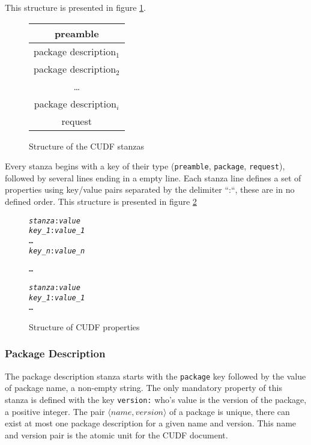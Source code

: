 This structure is presented in figure \ref{formal:cudfstruct}.

\begin{figure}[htp]
\centering
\begin{tabular}{|c|}
\hline preamble \\ \hline
\hline package description$_{1}$ \\ \hline
\hline package description$_{2}$ \\ \hline
 \multicolumn{1}{c}{\ldots}  \\ 
\hline package description$_{i}$\\ \hline
\hline request\\ \hline
\end{tabular}
\caption{Structure of the CUDF stanzas}
\label{formal:cudfstruct}
\end{figure}

Every stanza begins with a key of their type (\verb+preamble+, \verb+package+, \verb+request+), followed by several lines ending in a empty line.
Each stanza line defines a set of properties using key/value pairs separated by the delimiter ``:``, these are in no defined order.
This structure is presented in figure \ref{formal.cudfproperties}

\begin{figure}[htp] 
\begin{center}
\begin{alltt}
\textit{stanza}: \textit{value}
\textit{key_1\)}: \textit{value_1}
\ldots
\textit{key_n}: \textit{value_n}

\ldots

\textit{stanza}: \textit{value}
\textit{key_1}: \textit{value_1}
\ldots
\end{alltt}
  \caption[CUDF property structure]{Structure of CUDF properties}
  \label{formal.cudfproperties}
\end{center}
\end{figure}

\subsubsection{Package Description}
The package description stanza starts with the \verb+package+ key followed by the value of package name, a non-empty string.
The only mandatory property of this stanza is defined with the key \verb+version:+ who's value is the version of the package, a positive integer.
The pair $\langle name, version \rangle$ of a package is unique, there can exist at most one package description for a given name and version.
This name and version pair is the atomic unit for the CUDF document. 

